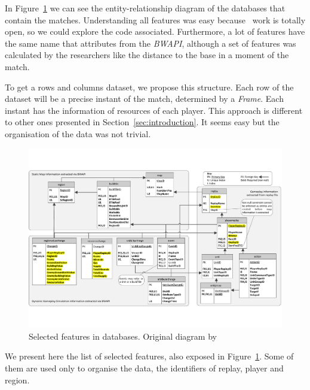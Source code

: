 \documentclass[a4paper,twoside]{article}\usepackage[]{graphicx}\usepackage[]{color}
\begin{document}
In Figure~\ref{fig:databaseSelection} we can see the entity-relationship diagram
of the databases that contain the matches. Understanding all features was easy
because~\cite{DBLP:conf/flairs/RobertsonW14} work is totally open, so we could
explore the code associated. Furthermore, a lot of features have the same name
that attributes from the \emph{BWAPI}, although a set of features was calculated
by the researchers like the distance to the base in a moment of the match.

To get a rows and columns dataset, we propose this structure. Each row of the
dataset will be a precise instant of the match, determined by a \emph{Frame}.
Each instant has the information of resources of each player. This approach
is different to other ones presented in Section~\ref{sec:introduction}. It
seems easy but the organisation of the data was not trivial.

\begin{figure}[!h]
  \centering
  \includegraphics[scale=0.5]{figure/Robertson14DatabaseDiagramSeleccion.pdf}
  \caption{Selected features in databases. Original diagram by~\cite{DBLP:conf/flairs/RobertsonW14}}
  \label{fig:databaseSelection}
\end{figure}

We present here the list of selected features, also exposed in
Figure~\ref{fig:databaseSelection}. Some of them are used only to organise the
data, the identifiers of replay, player and region.
\end{document}
